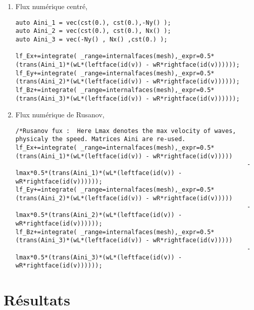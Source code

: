 \documentclass[a4paper,oneside,10pt]{report}
\begin{document}
\begin{enumerate}
\item Flux numérique centré,

\begin{center}
\begin{minipage}{\textwidth}
\begin{lstlisting}[label=code2,caption=Flux numerique centre]
auto Aini_1 = vec(cst(0.), cst(0.),-Ny() );
auto Aini_2 = vec(cst(0.), cst(0.), Nx() );
auto Aini_3 = vec(-Ny() , Nx() ,cst(0.) );

lf_Ex+=integrate( _range=internalfaces(mesh),_expr=0.5*(trans(Aini_1)*(wL*(leftface(id(v)) - wR*rightface(id(v))))));
lf_Ey+=integrate( _range=internalfaces(mesh),_expr=0.5*(trans(Aini_2)*(wL*(leftface(id(v)) - wR*rightface(id(v))))));
lf_Bz+=integrate( _range=internalfaces(mesh),_expr=0.5*(trans(Aini_3)*(wL*(leftface(id(v)) - wR*rightface(id(v))))));
\end{lstlisting}
\end{minipage}
\end{center}

\item Flux numérique de Rusanov,
\begin{center}
\begin{minipage}{\textwidth}
\begin{lstlisting}[label=code2,caption=Flux numerique de Rusanov]
/*Rusanov fux :  Here Lmax denotes the max velocity of waves, physicaly the speed. Matrices Aini are re-used.
lf_Ex+=integrate( _range=internalfaces(mesh),_expr=0.5*(trans(Aini_1)*(wL*(leftface(id(v)) - wR*rightface(id(v)))))
																- lmax*0.5*(trans(Aini_1)*(wL*(leftface(id(v)) - wR*rightface(id(v))))));
lf_Ey+=integrate( _range=internalfaces(mesh),_expr=0.5*(trans(Aini_2)*(wL*(leftface(id(v)) - wR*rightface(id(v)))))
																- lmax*0.5*(trans(Aini_2)*(wL*(leftface(id(v)) - wR*rightface(id(v))))));
lf_Bz+=integrate( _range=internalfaces(mesh),_expr=0.5*(trans(Aini_3)*(wL*(leftface(id(v)) - wR*rightface(id(v)))))
																- lmax*0.5*(trans(Aini_3)*(wL*(leftface(id(v)) - wR*rightface(id(v))))));
\end{lstlisting}
\end{minipage}
\end{center}

\end{enumerate}

\chapter{Résultats}
\end{document}
